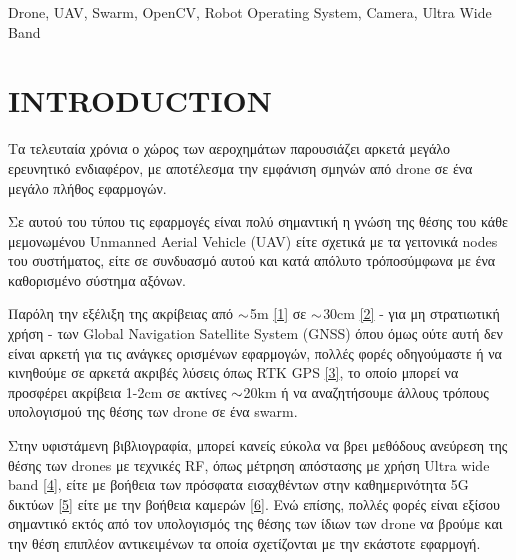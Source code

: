 \begin{abstract}
Η συγκεκριμένη διπλωματική ε\-ργα\-σία έχει στόχο την επίτευξη 
υπολογισμού της θέσης - στον τρισδιάστατο χώρο - ενός πρότυπου α\-ντι\-κειμένου, 
από ένα σμήνος drone\udot με όσο δυνατόν χαμηλότερο κόστος υλικού ανά node του 
συστήματος. Ιδανικά θα γίνει προσπάθεια να γίνει multi sensor data fusion 
και να αξιοποιηθούν πληροφορίες τόσο με βάση image-based τεχνικών υπολογισμού, 
όπως επίσης και RF-based.
\end{abstract}
  
\begin{keywords}
Drone, UAV, Swarm, OpenCV, Robot Operating System, Camera, Ultra Wide Band
\end{keywords}

\section{INTRODUCTION}
Τα τελευταία χρόνια ο χώρος των αεροχημάτων παρουσιάζει αρκετά μεγάλο ερευνητικό 
ενδιαφέρον, με αποτέλεσμα την εμφάνιση σμηνών από drone σε ένα μεγάλο
πλήθος εφαρμογών. 

Σε αυτού του τύπου τις εφαρμογές είναι πολύ σημαντική η γνώση της θέσης του κάθε 
μεμονωμένου Unmanned Aerial Vehicle (UAV) είτε σχετικά με τα γειτονικά nodes του 
συστήματος, είτε σε συ\-νδυα\-σμό αυτού και κατά απόλυτο τρόπο\udot σύμφωνα με ένα 
καθορισμένο σύστημα αξόνων.

Παρόλη την εξέλιξη της ακρίβειας από $\small \sim$5m \hyperref[bib:1]{[1]} 
σε $\small \sim$30cm \hyperref[bib:2]{[2]} - για μη στρατιωτική χρήση - των 
Global Navigation Satellite System (GNSS)\udot
όπου όμως ούτε αυτή δεν είναι αρκετή για τις ανάγκες ορισμένων εφαρμογών, 
πολλές φορές οδηγούμαστε ή να κινηθούμε σε αρκετά ακριβές 
λύσεις όπως RTK GPS \hyperref[bib:3]{[3]}, το οποίο μπορεί να προσφέρει ακρίβεια 1-2cm σε 
ακτίνες $\small \sim$20km ή να αναζητήσουμε άλλους τρόπους υπολογισμού της θέσης
των drone σε ένα swarm.

Στην υφιστάμενη βιβλιογραφία, μπορεί κανείς εύκολα να βρει μεθόδους ανεύρεση της θέσης  
των drones με τεχνικές RF, όπως μέτρηση απόστασης με 
χρήση Ultra wide band \hyperref[bib:4]{[4]}, είτε με βοήθεια των πρόσφατα εισαχθέντων στην καθημερινότητα
5G δικτύων \hyperref[bib:5]{[5]} είτε με την βοήθεια καμερών \hyperref[bib:6]{[6]}. Ενώ επίσης, πολλές φορές είναι
εξίσου σημαντικό εκτός από τον υπολογισμός της θέσης των ίδιων των drone να βρούμε και την
θέση επιπλέον αντικειμένων τα οποία σχετίζονται με την εκάστοτε εφαρμογή.

